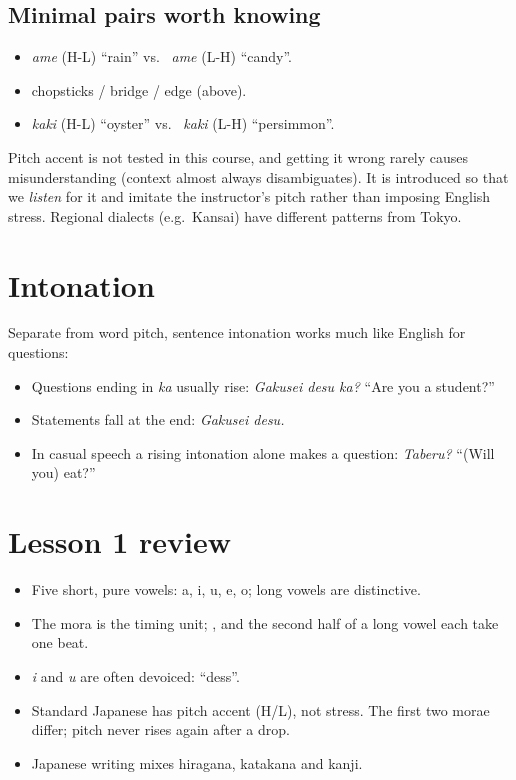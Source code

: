 \subsection{Minimal pairs worth knowing}
\begin{itemize}
  \item {} \emph{ame} (H-L) ``rain'' vs.\  \emph{ame} (L-H) ``candy''.
  \item {} chopsticks / bridge / edge (above).
  \item {} \emph{kaki} (H-L) ``oyster'' vs.\  \emph{kaki} (L-H) ``persimmon''.
\end{itemize}

\begin{remark}
Pitch accent is not tested in this course, and getting it wrong rarely causes
misunderstanding (context almost always disambiguates). It is introduced so that we
\emph{listen} for it and imitate the instructor's pitch rather than imposing English
stress. Regional dialects (e.g.\ Kansai) have different patterns from Tokyo.
\end{remark}

\section{Intonation}
Separate from word pitch, sentence intonation works much like English for questions:
\begin{itemize}
  \item Questions ending in  \emph{ka} usually rise: 
        \emph{Gakusei desu ka?} ``Are you a student?''
  \item Statements fall at the end:  \emph{Gakusei desu.}
  \item In casual speech a rising intonation alone makes a question:
         \emph{Taberu?} ``(Will you) eat?''
\end{itemize}

\section*{Lesson 1 review}
\begin{itemize}
  \item Five short, pure vowels: a, i, u, e, o; long vowels are distinctive.
  \item The mora is the timing unit; ,  and the second half of a long vowel
        each take one beat.
  \item \emph{i} and \emph{u} are often devoiced:  ``dess''.
  \item Standard Japanese has pitch accent (H/L), not stress. The first two morae differ;
        pitch never rises again after a drop.
  \item Japanese writing mixes hiragana, katakana and kanji.
\end{itemize}
